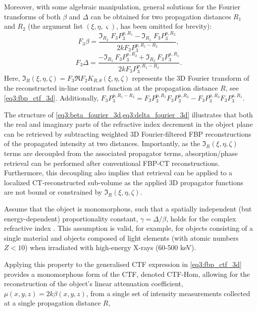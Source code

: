 \documentclass[twocolumn, switch]{article} %
\begin{document}
Moreover, with some algebraic manipulation, general solutions for the Fourier transforms of both $\beta$ and $\Delta$ can be obtained for two propagation distances ${R_1}$ and ${R_2}$ (the argument list $(\xi ,\eta ,\varsigma )$, has been omitted for brevity):
\begin{equation}
    \label{eq3:beta_fourier_3d}
    {F_3}\beta  = \frac{{{\Im _{{R_2}}}\;{F_3}P_3^{p,{R_1}} - {\Im _{{R_1}}}\;{F_3}P_3^{p,{R_2}}}}{{2k{F_3}P_3^{p,{R_1} - {R_2}}}},
\end{equation}
\begin{equation}
    \label{eq3:delta_fourier_3d}
    {F_3}\Delta  = \frac{{ - {\Im _{{R_1}}}\,{F_3}P_3^{a,{R_2}} + {\Im _{{R_2}}}\,{F_3}P_3^{a,{R_1}}}}{{2k{F_3}P_3^{p,{R_1} - {R_2}}}}.
\end{equation}
Here, ${\Im _R}\left( {\xi ,\eta ,\zeta } \right) = {F_3}\Re {F_2}{K_{R,\theta }}\left( {\xi ,\eta ,\zeta } \right)$ represents the 3D Fourier transform of the reconstructed in-line contrast function at the propagation distance $R$, see \cref{eq3:fbp_ctf_3d}. Additionally, ${F_3}P_3^{p,{R_1} - {R_2}} = {F_3}P_3^{p,{R_1}}{F_3}P_3^{a,{R_2}} - {F_3}P_3^{p,{R_2}}{F_3}P_3^{a,{R_1}}$.

The structure of \cref{eq3:beta_fourier_3d,eq3:delta_fourier_3d} illustrates that both the real and imaginary parts of the refractive index decrement in the object plane can be retrieved by subtracting weighted 3D Fourier-filtered FBP reconstructions of the propagated intensity at two distances. Importantly, as the ${\Im _R}\left( {\xi ,\eta ,\zeta } \right)$ terms are decoupled from the associated propagator terms, absorption/phase retrieval can be performed after conventional FBP-CT reconstructions. Furthermore, this decoupling also implies that retrieval can be applied to a localized CT-reconstructed sub-volume as the applied 3D propagator functions are not bound or constrained by ${\Im _R}\left( {\xi ,\eta ,\zeta }\right)$.

Assume that the object is monomorphous, such that a spatially independent (but energy-dependent) proportionality constant, $\gamma  = \Delta /\beta $, holds for the complex refractive index \cite{Paganin2002SimultaneousObject, Mayo2003X-rayMicrotomography}. This assumption is valid, for example, for objects consisting of a single material and objects composed of light elements (with atomic numbers $Z < 10$) when irradiated with high-energy X-rays (60-500 keV)\cite{Wu2003AImaging.}.

Applying this property to the generalised CTF expression in \cref{eq3:fbp_ctf_3d} provides a monomorphous form of the CTF, denoted CTF-Hom, allowing for the reconstruction of the object’s linear attenuation coefficient, $\mu(x,y,z)=2k \beta(x,y,z) $, from a single set of intensity measurements collected at a single propagation distance $R$,
\end{document}
